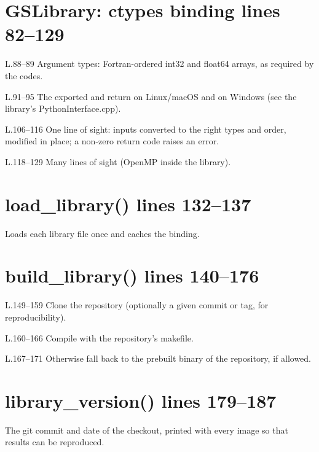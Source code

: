 \section*{\normalsize GSLibrary: ctypes binding \hfill{\small\mdseries\color{gray}lines 82--129}}

\begin{lines}
\item[L.88–89] Argument types: Fortran-ordered int32 and float64 arrays, as required by the codes.
\item[L.91–95] The exported  and  return  on Linux/macOS and  on Windows (see the library's PythonInterface.cpp).
\item[L.106–116] One line of sight: inputs converted to the right types and order,  modified in place; a non-zero return code raises an error.
\item[L.118–129] Many lines of sight (OpenMP inside the library).
\end{lines}
\section*{\normalsize load\_library() \hfill{\small\mdseries\color{gray}lines 132--137}}

Loads each library file once and caches the binding.

\section*{\normalsize build\_library() \hfill{\small\mdseries\color{gray}lines 140--176}}

\begin{lines}
\item[L.149–159] Clone the repository (optionally a given commit or tag, for reproducibility).
\item[L.160–166] Compile with the repository's makefile.
\item[L.167–171] Otherwise fall back to the prebuilt binary of the repository, if allowed.
\end{lines}
\section*{\normalsize library\_version() \hfill{\small\mdseries\color{gray}lines 179--187}}

The git commit and date of the checkout, printed with every image so that results can be reproduced.

